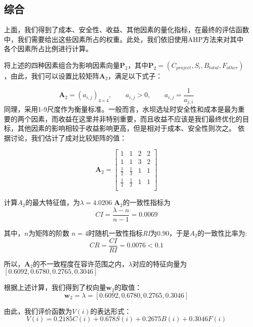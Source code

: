 \documentclass[nocover]{cumcmart}
\begin{document}
\subsection{综合}
上面，我们得到了成本、安全性、收益、其他因素的量化指标，在最终的评估函数中，我们需要给出这些因素所占的权重。此处，我们依旧使用AHP方法来对其中各个因素所占比例进行计算。

将上述的四种因素组合为影响因素向量$\textbf{P}_2$，其中$\textbf{P}_2 = (C_{project}, S_{i}, B_{total}, F_{other})$，由此，我们可以设置比较矩阵$\textbf{A}_2$，满足以下式子：

\[\textbf{A}_2 = (a_{i,j})_{4\times4}, \qquad a_{i,j}>0, \qquad a_{i,j} = \frac{1}{a_{j,i}}\]
同理，采用1-9尺度作为衡量标准。一般而言，水坝选址时安全性和成本是最为重要的两个因素，而收益在这里并非特别重要，而且收益不应该是我们最终优化的目标，其他因素的影响相较于收益影响更高，但是相对于成本、安全性则次之。
依据讨论，我们估计了成对比较矩阵的值：

\[\textbf{A}_2 =
\left[
\begin{matrix}
1 & 1 & 2 & 2 \\
1 & 1 & 3 & 2 \\
\frac{1}{2}& \frac{1}{3} & 1 & 1 \\
\frac{1}{2} & \frac{1}{2} & 1 & 1 \\
\end{matrix}
\right]
\]

计算$A_{2}$的最大特征值，为$\lambda = 4.0206$
$\textbf{A}_2$的一致性指标为
\[\mathit{CI} = \frac{\lambda - n}{n - 1} = 0.0069\]

其中，$n$为矩阵的阶数
$n = 4$时随机一致性指标\textit{RI}为$0.90$，于是$A_{2}$的一致性比率为:
\[\mathit{CR} = \frac{\mathit{CI}}{\mathit{RI}} = 0.0076 < 0.1 \]

所以，$\textbf{A}_2$的不一致程度在容许范围之内，$\lambda$对应的特征向量为$\left[0.6092, 0.6780, 0.2765, 0.3046\right]$

根据上述计算，我们得到了权向量$\textbf{w}_{2}$的取值：
\begin{equation}
\textbf{w}_{2} = \lambda = \left[0.6092, 0.6780, 0.2765, 0.3046\right]
\end{equation}

由此，我们评价函数为$V(i)$的表达形式：
\begin{equation}
V(i) = 0.2185C(i) + 0.678S(i) + 0.2675B(i) + 0.3046F(i)
\end{equation}
\end{document}
